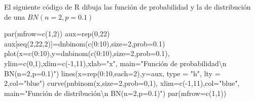 \documentclass[
  letterpaper,
  DIV=11,
  numbers=noendperiod]{scrreprt}
\newenvironment{Shaded}{\begin{snugshade}}{\end{snugshade}}
\newcommand{\AttributeTok}[1]{\textcolor[rgb]{0.40,0.45,0.13}{#1}}
\newcommand{\DecValTok}[1]{\textcolor[rgb]{0.68,0.00,0.00}{#1}}
\newcommand{\FloatTok}[1]{\textcolor[rgb]{0.68,0.00,0.00}{#1}}
\newcommand{\FunctionTok}[1]{\textcolor[rgb]{0.28,0.35,0.67}{#1}}
\newcommand{\NormalTok}[1]{\textcolor[rgb]{0.00,0.23,0.31}{#1}}
\newcommand{\OtherTok}[1]{\textcolor[rgb]{0.00,0.23,0.31}{#1}}
\newcommand{\SpecialCharTok}[1]{\textcolor[rgb]{0.37,0.37,0.37}{#1}}
\newcommand{\StringTok}[1]{\textcolor[rgb]{0.13,0.47,0.30}{#1}}
\begin{document}
El siguiente código de R dibuja las función de probabilidad y la de
distribución de una \(BN(n=2,p=0.1)\)

\begin{Shaded}
\begin{Highlighting}[]
\FunctionTok{par}\NormalTok{(}\AttributeTok{mfrow=}\FunctionTok{c}\NormalTok{(}\DecValTok{1}\NormalTok{,}\DecValTok{2}\NormalTok{))}
\NormalTok{aux}\OtherTok{=}\FunctionTok{rep}\NormalTok{(}\DecValTok{0}\NormalTok{,}\DecValTok{22}\NormalTok{)}
\NormalTok{aux[}\FunctionTok{seq}\NormalTok{(}\DecValTok{2}\NormalTok{,}\DecValTok{22}\NormalTok{,}\DecValTok{2}\NormalTok{)]}\OtherTok{=}\FunctionTok{dnbinom}\NormalTok{(}\FunctionTok{c}\NormalTok{(}\DecValTok{0}\SpecialCharTok{:}\DecValTok{10}\NormalTok{),}\AttributeTok{size=}\DecValTok{2}\NormalTok{,}\AttributeTok{prob=}\FloatTok{0.1}\NormalTok{)}
\FunctionTok{plot}\NormalTok{(}\AttributeTok{x=}\FunctionTok{c}\NormalTok{(}\DecValTok{0}\SpecialCharTok{:}\DecValTok{10}\NormalTok{),}\AttributeTok{y=}\FunctionTok{dnbinom}\NormalTok{(}\FunctionTok{c}\NormalTok{(}\DecValTok{0}\SpecialCharTok{:}\DecValTok{10}\NormalTok{),}\AttributeTok{size=}\DecValTok{2}\NormalTok{,}\AttributeTok{prob=}\FloatTok{0.1}\NormalTok{),}
  \AttributeTok{ylim=}\FunctionTok{c}\NormalTok{(}\DecValTok{0}\NormalTok{,}\DecValTok{1}\NormalTok{),}\AttributeTok{xlim=}\FunctionTok{c}\NormalTok{(}\SpecialCharTok{{-}}\DecValTok{1}\NormalTok{,}\DecValTok{11}\NormalTok{),}\AttributeTok{xlab=}\StringTok{"x"}\NormalTok{,}
  \AttributeTok{main=}\StringTok{"Función de probabilidad}\SpecialCharTok{\textbackslash{}n}\StringTok{ BN(n=2,p=0.1)"}\NormalTok{)}
\FunctionTok{lines}\NormalTok{(}\AttributeTok{x=}\FunctionTok{rep}\NormalTok{(}\DecValTok{0}\SpecialCharTok{:}\DecValTok{10}\NormalTok{,}\AttributeTok{each=}\DecValTok{2}\NormalTok{),}\AttributeTok{y=}\NormalTok{aux, }\AttributeTok{type =} \StringTok{"h"}\NormalTok{, }\AttributeTok{lty =} \DecValTok{2}\NormalTok{,}\AttributeTok{col=}\StringTok{"blue"}\NormalTok{)}
\FunctionTok{curve}\NormalTok{(}\FunctionTok{pnbinom}\NormalTok{(x,}\AttributeTok{size=}\DecValTok{2}\NormalTok{,}\AttributeTok{prob=}\DecValTok{0}\NormalTok{,}\DecValTok{1}\NormalTok{),}
  \AttributeTok{xlim=}\FunctionTok{c}\NormalTok{(}\SpecialCharTok{{-}}\DecValTok{1}\NormalTok{,}\DecValTok{11}\NormalTok{),}\AttributeTok{col=}\StringTok{"blue"}\NormalTok{,}
  \AttributeTok{main=}\StringTok{"Función de distribución}\SpecialCharTok{\textbackslash{}n}\StringTok{ BN(n=2,p=0.1)"}\NormalTok{)}
\FunctionTok{par}\NormalTok{(}\AttributeTok{mfrow=}\FunctionTok{c}\NormalTok{(}\DecValTok{1}\NormalTok{,}\DecValTok{1}\NormalTok{))}
\end{Highlighting}
\end{Shaded}
\end{document}
